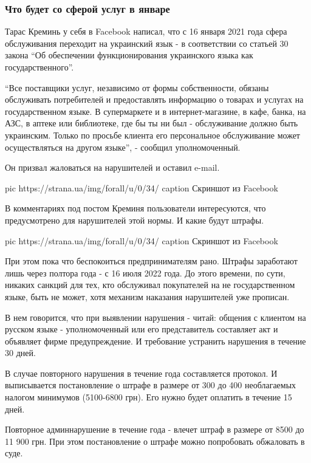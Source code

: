  
 
 
 
 

\subsubsection{Что будет со сферой услуг в январе}
\label{sec:02_12_2020.news.ua.strana.venk_victoria.1.mova_shtrafy_ukrainizacia.janvar}

Тарас Креминь у себя в Facebook написал, что с 16 января 2021 года сфера
обслуживания переходит на украинский язык - в соответствии со статьей 30 закона
\enquote{Об обеспечении функционирования украинского языка как государственного}. 

\enquote{Все поставщики услуг, независимо от формы собственности, обязаны
обслуживать потребителей и предоставлять информацию о товарах и услугах на
государственном языке. В супермаркете и в интернет-магазине, в кафе, банка, на
АЗС, в аптеке или библиотеке, где бы ты ни был - обслуживание должно быть
украинским. Только по просьбе клиента его персональное обслуживание может
осуществляться на другом языке}, - сообщил уполномоченный. 

Он призвал жаловаться на нарушителей и оставил e-mail.

\ifcmt
pic https://strana.ua/img/forall/u/0/34/%
caption Скриншот из Facebook
\fi

В комментариях под постом Креминя пользователи интересуются, что предусмотрено
для нарушителей этой нормы. И какие будут штрафы. 

\ifcmt
pic https://strana.ua/img/forall/u/0/34/%
caption Скриншот из Facebook
\fi

При этом пока что беспокоиться предпринимателям рано. Штрафы заработают лишь
через полтора года - с 16 июля 2022 года. До этого времени, по сути, никаких
санкций для тех, кто обслуживал покупателей на не государственном языке, быть
не может, хотя механизм наказания нарушителей уже прописан. 

В нем говорится, что при выявлении нарушения - читай: общения с клиентом на
русском языке - уполномоченный или его представитель составляет акт и объявляет
фирме предупреждение. И требование устранить нарушения в течение 30 дней. 

В случае повторного нарушения в течение года составляется протокол. И
выписывается постановление о штрафе в размере от 300 до 400 необлагаемых
налогом минимумов (5100-6800 грн). Его нужно будет оплатить в течение 15 дней.

Повторное админнарушение в течение года - влечет штраф в размере от 8500 до 11
900 грн. При этом постановление о штрафе можно попробовать обжаловать в суде. 


